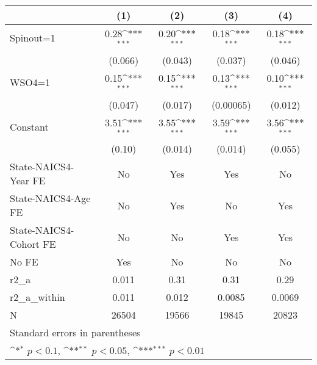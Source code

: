 {
\def\sym#1{\ifmmode^{#1}\else\(^{#1}\)\fi}
\begin{tabular}{l*{4}{c}}
\hline\hline
                    &\multicolumn{1}{c}{(1)}         &\multicolumn{1}{c}{(2)}         &\multicolumn{1}{c}{(3)}         &\multicolumn{1}{c}{(4)}         \\
\hline
Spinout=1           &        0.28\sym{***}&        0.20\sym{***}&        0.18\sym{***}&        0.18\sym{***}\\
                    &     (0.066)         &     (0.043)         &     (0.037)         &     (0.046)         \\
[1em]
WSO4=1              &        0.15\sym{***}&        0.15\sym{***}&        0.13\sym{***}&        0.10\sym{***}\\
                    &     (0.047)         &     (0.017)         &   (0.00065)         &     (0.012)         \\
[1em]
Constant            &        3.51\sym{***}&        3.55\sym{***}&        3.59\sym{***}&        3.56\sym{***}\\
                    &      (0.10)         &     (0.014)         &     (0.014)         &     (0.055)         \\
[1em]
State-NAICS4-Year FE&          No         &         Yes         &         Yes         &          No         \\
[1em]
State-NAICS4-Age FE &          No         &         Yes         &          No         &         Yes         \\
[1em]
State-NAICS4-Cohort FE&          No         &          No         &         Yes         &         Yes         \\
[1em]
No FE               &         Yes         &          No         &          No         &          No         \\
\hline
r2\_a                &       0.011         &        0.31         &        0.31         &        0.29         \\
r2\_a\_within         &       0.011         &       0.012         &      0.0085         &      0.0069         \\
N                   &       26504         &       19566         &       19845         &       20823         \\
\hline\hline
\multicolumn{5}{l}{\footnotesize Standard errors in parentheses}\\
\multicolumn{5}{l}{\footnotesize \sym{*} \(p<0.1\), \sym{**} \(p<0.05\), \sym{***} \(p<0.01\)}\\
\end{tabular}
}
